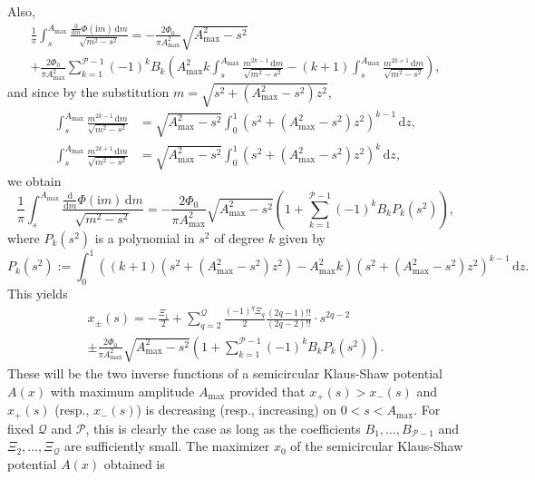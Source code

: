 \documentclass[12pt]{amsart}
\numberwithin{equation}{section}
\newcommand{\dd}{\mathrm{d}}
\newcommand{\ii}{\mathrm{i}}
\newcommand{\phaseint}{\Phi}
\newcommand{\tailint}{\Xi}
\begin{document}
Also,
\begin{multline}
\frac{1}{\pi}\int_s^{A_\mathrm{max}}\frac{\displaystyle\frac{\dd}{\dd m}\phaseint(\ii m)\,\dd m}{\sqrt{m^2-s^2}} =
-\frac{2\phaseint_0}{\pi A_\mathrm{max}^2} \sqrt{A_\mathrm{max}^2-s^2} \\
+\frac{2\phaseint_0}{\pi A_\mathrm{max}^2} \sum_{k=1}^{\mathcal{P}-1}(-1)^kB_k\left(A_\mathrm{max}^2k\int_s^{A_\mathrm{max}}\frac{m^{2k-1}\,\dd m}{\sqrt{m^2-s^2}}-(k+1)\int_s^{A_\mathrm{max}}\frac{m^{2k+1}\,\dd m}{\sqrt{m^2-s^2}}\right),
\end{multline}
and since by the substitution $m=\sqrt{s^2+(A_\mathrm{max}^2-s^2)z^2}$,
\begin{equation}
\begin{split}
\int_s^{A_\mathrm{max}}\frac{m^{2k-1}\,\dd m}{\sqrt{m^2-s^2}}
&= \sqrt{A_\mathrm{max}^2-s^2}\int_0^1(s^2+(A_\mathrm{max}^2-s^2)z^2)^{k-1}\,\dd z,\\
\int_s^{A_\mathrm{max}}\frac{m^{2k+1}\,\dd m}{\sqrt{m^2-s^2}}&=\sqrt{A_\mathrm{max}^2-s^2}\int_0^1(s^2+(A_\mathrm{max}^2-s^2)z^2)^k\,\dd z,
\end{split}
\end{equation}
we obtain
\begin{equation}
\frac{1}{\pi}\int_s^{A_\mathrm{max}}\frac{\displaystyle\frac{\dd}{\dd m}\phaseint(\ii m)\,\dd m}{\sqrt{m^2-s^2}}
=-\frac{2\phaseint_0}{\pi A_\mathrm{max}^2} \sqrt{A_\mathrm{max}^2-s^2}
\left(1+\sum_{k=1}^{\mathcal{P}-1}(-1)^kB_k P_{k}(s^2)\right), 
\end{equation}
where $P_{k}(s^2)$ is a polynomial in $s^2$ of degree $k$ given by
\begin{equation}
P_{k}(s^2):=\int_0^1\left((k+1)(s^2+(A_\mathrm{max}^2-s^2)z^2)-A_\mathrm{max}^2k\right)(s^2+(A_\mathrm{max}^2-s^2)z^2)^{k-1}\,\dd z.
\end{equation}
This yields
\begin{multline}
x_\pm(s)=-\frac{\tailint_1}{2} +\sum_{q=2}^\mathcal{Q}\frac{(-1)^q\tailint_q}{2}\frac{(2q-1)!!}{(2q-2)!!}\cdot s^{2q-2}\\
\pm \frac{2\phaseint_0}{\pi A_\mathrm{max}^2} \sqrt{A_\mathrm{max}^2-s^2}\left(1+\sum_{k=1}^{\mathcal{P}-1}(-1)^kB_kP_{k}(s^2)\right).
\label{eq:inverse-functions-polynomials}
\end{multline}
These will be the two inverse functions of a semicircular Klaus-Shaw potential $A(x)$ with maximum amplitude $A_\mathrm{max}$ provided that $x_+(s)>x_-(s)$ and $x_+(s)$ (resp., $x_-(s)$) is decreasing (resp., increasing) on $0<s<A_\mathrm{max}$.  For fixed $\mathcal{Q}$ and $\mathcal{P}$, this is clearly the case as long as the coefficients $B_1,\dots,B_{\mathcal{P}-1}$ and $\tailint_2,\dots,\tailint_\mathcal{Q}$ are sufficiently small.  The maximizer $x_0$ of the semicircular Klaus-Shaw potential $A(x)$ obtained is 
\end{document}
